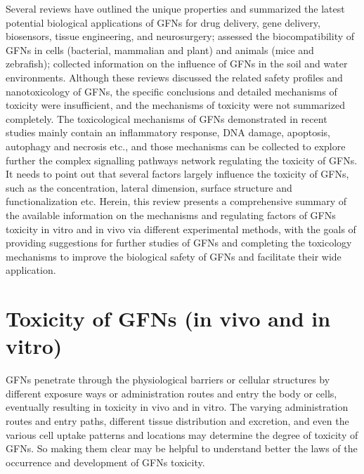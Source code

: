 \documentclass[twoside,twocolumn,9pt]{article}
\begin{document}
Several reviews have outlined the unique properties and summarized the latest potential biological applications of GFNs for drug delivery, gene delivery, biosensors, tissue engineering, and neurosurgery; assessed the biocompatibility of GFNs in cells (bacterial, mammalian and plant) and animals (mice and zebrafish); collected information on the influence of GFNs in the soil and water environments. Although these reviews discussed the related safety profiles and nanotoxicology of GFNs, the specific conclusions and detailed mechanisms of toxicity were insufficient, and the mechanisms of toxicity were not summarized completely. The toxicological mechanisms of GFNs demonstrated in recent studies mainly contain an inflammatory response, DNA damage, apoptosis, autophagy and necrosis etc., and those mechanisms can be collected to explore further the complex signalling pathways network regulating the toxicity of GFNs. It needs to point out that several factors largely influence the toxicity of GFNs, such as the concentration, lateral dimension, surface structure and functionalization etc. Herein, this review presents a comprehensive summary of the available information on the mechanisms and regulating factors of GFNs toxicity in vitro and in vivo via different experimental methods, with the goals of providing suggestions for further studies of GFNs and completing the toxicology mechanisms to improve the biological safety of GFNs and facilitate their wide application.


\section{Toxicity of GFNs (in vivo and in vitro)}
GFNs penetrate through the physiological barriers or cellular structures by different exposure ways or administration routes and entry the body or cells, eventually resulting in toxicity in vivo and in vitro. The varying administration routes and entry paths, different tissue distribution and excretion, and even the various cell uptake patterns and locations may determine the degree of toxicity of GFNs. So making them clear may be helpful to understand better the laws of the occurrence and development of GFNs toxicity.
\end{document}
